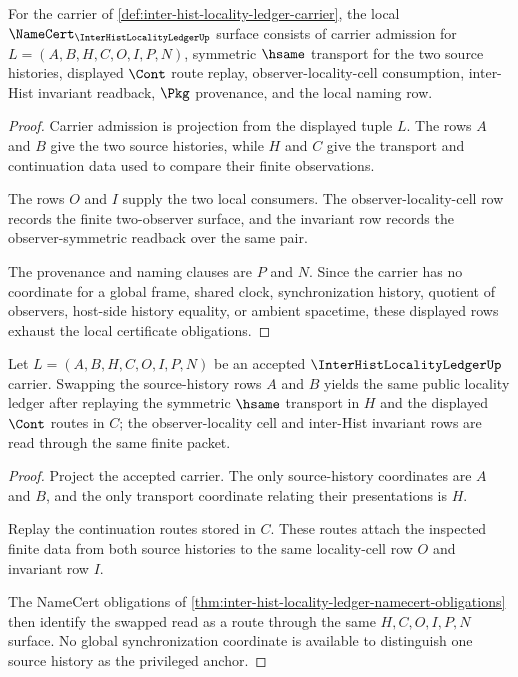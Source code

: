 \begin{theorem}
\label{thm:inter-hist-locality-ledger-namecert-obligations}
For the carrier of \autoref{def:inter-hist-locality-ledger-carrier}, the local $\NameCert_{\InterHistLocalityLedgerUp}$ surface consists of carrier admission for $L=(A,B,H,C,O,I,P,N)$, symmetric $\hsame$ transport for the two source histories, displayed $\Cont$ route replay, observer-locality-cell consumption, inter-Hist invariant readback, $\Pkg$ provenance, and the local naming row.
\end{theorem}
\begin{proof}
Carrier admission is projection from the displayed tuple $L$. The rows $A$ and $B$ give the two source histories, while $H$ and $C$ give the transport and continuation data used to compare their finite observations.

The rows $O$ and $I$ supply the two local consumers. The observer-locality-cell row records the finite two-observer surface, and the invariant row records the observer-symmetric readback over the same pair.

The provenance and naming clauses are $P$ and $N$. Since the carrier has no coordinate for a global frame, shared clock, synchronization history, quotient of observers, host-side history equality, or ambient spacetime, these displayed rows exhaust the local certificate obligations.
\end{proof}

\begin{theorem}
\label{thm:inter-hist-locality-ledger-symmetric-route}
Let $L=(A,B,H,C,O,I,P,N)$ be an accepted $\InterHistLocalityLedgerUp$ carrier. Swapping the source-history rows $A$ and $B$ yields the same public locality ledger after replaying the symmetric $\hsame$ transport in $H$ and the displayed $\Cont$ routes in $C$; the observer-locality cell and inter-Hist invariant rows are read through the same finite packet.
\end{theorem}
\begin{proof}
Project the accepted carrier. The only source-history coordinates are $A$ and $B$, and the only transport coordinate relating their presentations is $H$.

Replay the continuation routes stored in $C$. These routes attach the inspected finite data from both source histories to the same locality-cell row $O$ and invariant row $I$.

The NameCert obligations of \autoref{thm:inter-hist-locality-ledger-namecert-obligations} then identify the swapped read as a route through the same $H,C,O,I,P,N$ surface. No global synchronization coordinate is available to distinguish one source history as the privileged anchor.
\end{proof}

